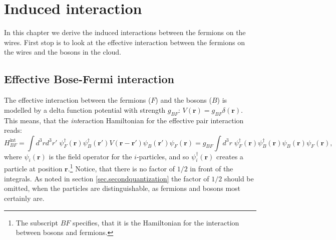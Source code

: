 
\chapter{Induced interaction} %

\label{Chapter3} %


In this chapter we derive the induced interactions between the fermions on the wires. First stop is to look at the effective interaction between the fermions on the wires and the bosons in the cloud.
\section{Effective Bose-Fermi interaction}
The effective interaction between the fermions ($F$) and the bosons ($B$) is modelled by a delta function potential with strength $g_{BF}$: $V(\mathbf{r})=g_{BF}\delta(\mathbf{r})$. This means, that the \textit{int}eraction Hamiltonian for the effective pair interaction reads:
\begin{equation}
H_{BF}^\text{int}  = \int d^3 r d^3 r' \; \psi_F^\dagger(\mathbf{r}) \psi_B^\dagger(\mathbf{r}')V(\mathbf{r}-\mathbf{r}')\psi_B(\mathbf{r}')\psi_F(\mathbf{r}) = g_{BF}\int d^3 r \; \psi_F^\dagger(\mathbf{r}) \psi_B^\dagger(\mathbf{r})\psi_B(\mathbf{r})\psi_F(\mathbf{r}),
\label{eq.HintBF}
\end{equation}
where $\psi_i(\mathbf{r})$ is the field operator for the $i$-particles, and so $\psi_i^\dagger(\mathbf{r})$ creates a particle at position $\mathbf{r}$.\footnote{The subscript $BF$ specifies, that it is the Hamiltonian for the interaction between bosons and fermions.} Notice, that there is no factor of $1/2$ in front of the integrals. As noted in section \ref{sec.secondquantization} the factor of $1/2$ should be omitted, when the particles are distinguishable, as fermions and bosons most certainly are. 


